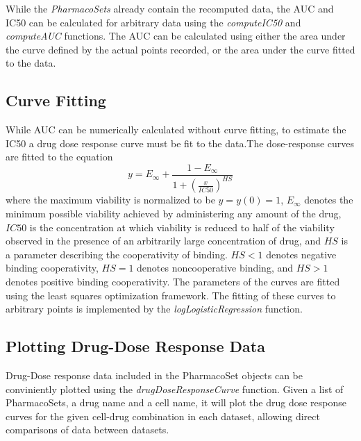 \documentclass[11pt]{article}
\begin{document}
While the \textit{PharmacoSets} already contain the recomputed data, the AUC and IC50 can be calculated for arbitrary data using the \textit{computeIC50} and \textit{computeAUC} functions. The AUC can be calculated using either the area under the curve defined by the actual points recorded, or the area under the curve fitted to the data. 

\subsection{Curve Fitting}
While AUC can be numerically calculated without curve fitting, to estimate the IC50 a drug dose response curve must be fit to the data.The dose-response curves are fitted to the equation
$$y = E_{\infty} +  \frac{ 1 - E_{\infty} }{1+(\frac{x}{IC50})^{HS}}$$
where the maximum viability is normalized to be $y = y(0) = 1$, $E_{\infty}$ denotes the minimum possible viability achieved by administering any amount of the drug, $IC50$ is the concentration at which viability is reduced to half of the viability observed in the presence of an arbitrarily large concentration of drug, and $HS$ is a parameter describing the cooperativity of binding. $HS < 1$ denotes negative binding cooperativity, $HS = 1$ denotes noncooperative binding, and $HS > 1$ denotes positive binding cooperativity. The parameters of the curves are fitted using the least squares optimization framework. The fitting of these curves to arbitrary points is implemented by the \textit{logLogisticRegression} function. 

\subsection{Plotting Drug-Dose Response Data}
Drug-Dose response data included in the PharmacoSet objects can be conviniently plotted using the \textit{drugDoseResponseCurve} function. Given a list of PharmacoSets, a drug name and a cell name, it will plot the drug dose response curves for the given cell-drug combination in each dataset, allowing direct comparisons of data between datasets. 

\end{document}

